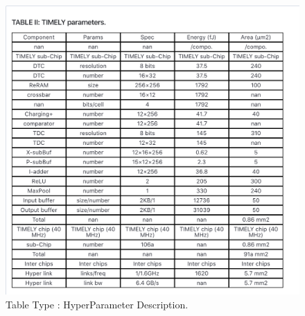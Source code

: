 \begin{figure}[h!]
    \centering
    \includegraphics[width=\maxwidth{\textwidth}]{src/images/type-exp-hparam.png}
    \caption{Table Type : HyperParameter Description.}
    \label{figure\arabic{figurecounter}}
\end{figure}


